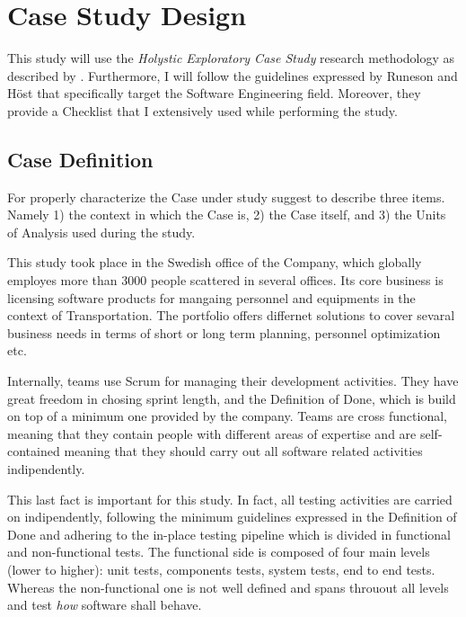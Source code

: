 \chapter{Case Study Design} \label{methods}
This study will use the \textit{Holystic Exploratory Case Study} research methodology as described by \cite{case_study_guide}. Furthermore, I will follow the guidelines expressed by Runeson and H{\"o}st \cite{case_study_software_engineering} that specifically target the Software Engineering field. Moreover, they provide a Checklist that I extensively used while performing the study.



%
%
%
%
\section{Case Definition}	\label{case-description}
For properly characterize the Case under study \cite{case_study_guide} suggest to describe three items. Namely 1) the context in which the Case is, 2) the Case itself, and 3) the Units of Analysis used during the study.

This study took place in the Swedish office of the Company, which globally employes more than 3000 people scattered in several offices. Its core business is licensing software products for mangaing personnel and equipments in the context of Transportation. The portfolio offers differnet solutions to cover sevaral business needs in terms of short or long term planning, personnel optimization etc.

Internally, teams use Scrum for managing their development activities. They have great freedom in chosing sprint length, and the Definition of Done, which is build on top of a minimum one provided by the company. Teams are cross functional, meaning that they contain people with different areas of expertise and are self-contained meaning that they should carry out all software related activities indipendently.

This last fact is important for this study. In fact, all testing activities are carried on indipendently, following the minimum guidelines expressed in the Definition of Done and adhering to the in-place testing pipeline which is divided in functional and non-functional tests. The functional side is composed of four main levels (lower to higher): unit tests, components tests, system tests, end to end tests. Whereas the non-functional one is not well defined and spans throuout all levels and test \textit{how} software shall behave.

